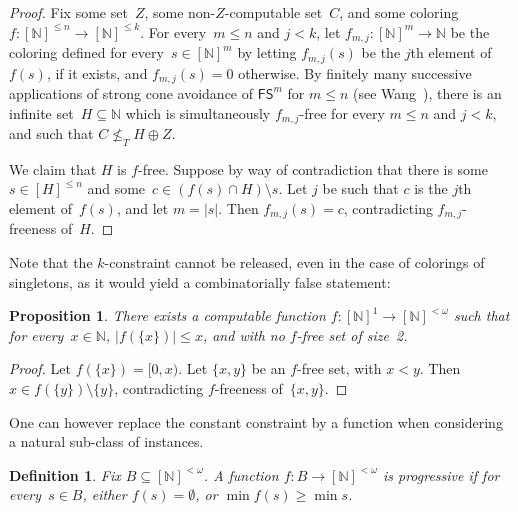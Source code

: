 \documentclass{article}
\newcommand{\FS}[0]{\mathsf{FS}}
\newcommand{\NN}[0]{\mathbb{N}}
\numberwithin{theorem}{section}
\newtheorem{proposition}[theorem]{Proposition}
\newtheorem{definition}[theorem]{Definition}
\begin{document}
\begin{proof}
Fix some set~$Z$, some non-$Z$-computable set~$C$, and some coloring $f : [\NN]^{\leq n} \to [\NN]^{\leq k}$.
For every~$m \leq n$ and $j < k$, let $f_{m, j} : [\NN]^m \to \NN$ be the coloring defined for every~$s \in [\NN]^m$ by letting $f_{m, j}(s)$ be the $j$th element of~$f(s)$, if it exists, and $f_{m, j}(s) = 0$ otherwise. By finitely many successive applications of strong cone avoidance of $\FS^m$ for $m \leq n$ (see Wang~\cite{wang2014some}), there is an infinite set~$H \subseteq \NN$ which is simultaneously $f_{m,j}$-free for every $m \leq n$ and $j < k$, and such that $C \not \leq_T H \oplus Z$.

We claim that $H$ is $f$-free. Suppose by way of contradiction that there is some~$s \in [H]^{\leq n}$ and some~$c \in (f(s) \cap H) \setminus s$. %
Let $j$ be such that $c$ is the $j$th element of~$f(s)$, and let $m = |s|$. Then $f_{m,j}(s) = c$, contradicting $f_{m,j}$-freeness of~$H$.
\end{proof}

Note that the $k$-constraint cannot be released, even in the case of colorings of singletons, as it would yield a combinatorially false statement:

\begin{proposition}
There exists a computable function $f : [\NN]^1 \to [\NN]^{<\omega}$ such that for every~$x \in \NN$, $|f(\{x\})| \leq x$, and with no $f$-free set of size~2.
\end{proposition}
\begin{proof}
Let $f(\{x\}) = [0, x)$. Let $\{x, y\}$ be an $f$-free set, with $x < y$. Then $x \in f(\{y\}) \setminus \{y\}$, contradicting $f$-freeness of~$\{x,y\}$.
\end{proof}

One can however replace the constant constraint by a function when considering a natural sub-class of instances.

\begin{definition}
Fix $B \subseteq [\NN]^{<\omega}$.
A function $f : B \to [\NN]^{<\omega}$ is \emph{progressive} if for every~$s \in B$, either $f(s) = \emptyset$, or $\min f(s)\geq \min s$.
\end{definition}
\end{document}
